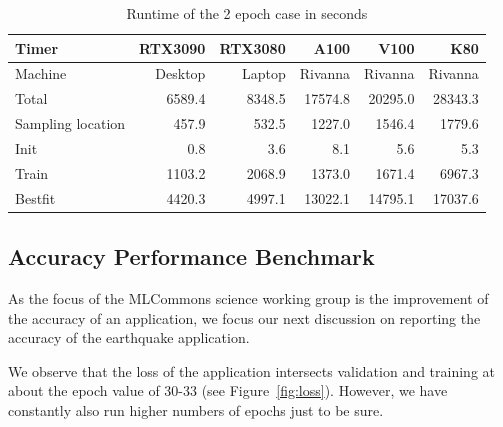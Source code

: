 \documentclass[utf8]{FrontiersinVancouver} %
\begin{document}
\begin{table}[htb]
    \caption{Runtime of the 2 epoch case in seconds}
    \label{tab:2-epoch-case}
    \begin{center}
    {\footnotesize              

          \begin{tabular}{lrrrrr}
            Timer             & RTX3090 & RTX3080 & A100    & V100    & K80     \\
            \hline
            Machine           & Desktop & Laptop  & Rivanna & Rivanna & Rivanna \\
            Total             & 6589.4  & 8348.5  & 17574.8 & 20295.0 & 28343.3 \\
            Sampling location &  457.9  &  532.5  &  1227.0 &  1546.4 &  1779.6 \\
            Init              &    0.8  &    3.6  &    8.1  &     5.6 &     5.3 \\
            Train             & 1103.2  & 2068.9  &  1373.0 &  1671.4 &  6967.3 \\
            Bestfit           & 4420.3  & 4997.1  & 13022.1 & 14795.1 & 17037.6 \\
            \hline
          \end{tabular}

    }
    \end{center}
\end{table}


\subsection{Accuracy Performance Benchmark}
\label{sec:perf-accuracy}



As the focus of the MLCommons science working group is the improvement
of the accuracy of an application, we focus our next discussion on
reporting the accuracy of the earthquake application.

We observe that the loss of the application intersects validation and
training at about the epoch value of 30-33 (see Figure~\ref{fig:loss}).  However, we have
constantly also run higher numbers of epochs just to be sure.
\end{document}
